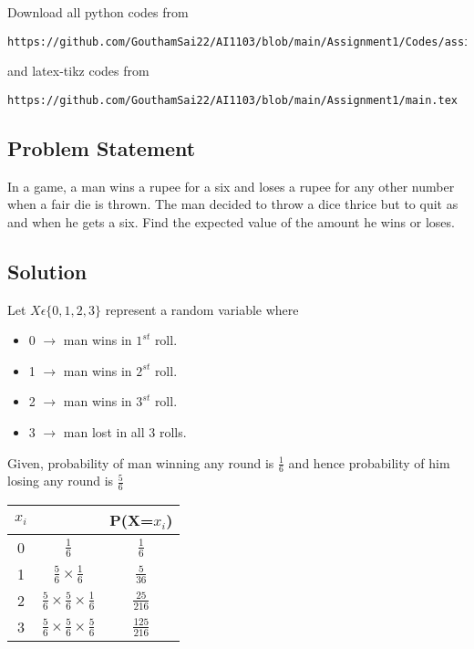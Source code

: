 \documentclass[journal,12pt,twocolumn]{IEEEtran}
\begin{document}
\maketitle
\newpage
\bigskip
\renewcommand{\thefigure}{\theenumi}
\renewcommand{\thetable}{\theenumi}
Download all python codes from 
\begin{lstlisting}
https://github.com/GouthamSai22/AI1103/blob/main/Assignment1/Codes/assign1.py
\end{lstlisting}
%
and latex-tikz codes from 
%
\begin{lstlisting}
https://github.com/GouthamSai22/AI1103/blob/main/Assignment1/main.tex
\end{lstlisting}
\begin{center}
  \section{\textbf{Problem Statement}} 
\end{center}
In a game, a man wins a rupee for a six and loses a rupee for any other number when a fair die is thrown. The man decided to throw a dice thrice but to quit as and when he gets a six. Find the expected value of the amount he wins or loses.
\begin{center}
   \section{\textbf{Solution}}
\end{center}
Let $X \epsilon \{0,1,2,3\}$ represent a random variable where
\begin{itemize}
    \item 0 $\rightarrow$ man wins in $1^{st}$ roll.
    \item 1 $\rightarrow$ man wins in $2^{st}$ roll.
    \item 2 $\rightarrow$ man wins in $3^{st}$ roll.
    \item 3 $\rightarrow$ man lost in all 3 rolls.
\end{itemize}
Given, probability of man winning any round is $\frac{1}{6}$ and hence probability of him losing any round is $\frac{5}{6}$
\begin{center}
    \begin{tabular}{|c|c|c|}
      \hline
      $x_i$ & & P(X=$x_i$)  \\
      \hline
      0 & $\frac{1}{6}$ & $\frac{1}{6}$ \\[1 ex]
      \hline
      1 & $\frac{5}{6} \times \frac{1}{6}$ & $\frac{5}{36}$ \\[1 ex]
      \hline
      2 & $\frac{5}{6} \times \frac{5}{6} \times \frac{1}{6}$ & $\frac{25}{216}$ \\[1 ex]
      \hline
      3 & $\frac{5}{6} \times \frac{5}{6} \times \frac{5}{6}$ & $\frac{125}{216}$ \\[1 ex]
      \hline
    \end{tabular}
\end{center}
\end{document}
